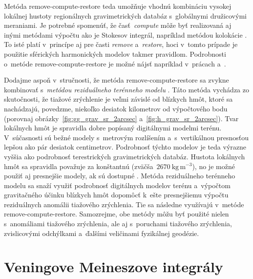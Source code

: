 \documentclass[a4paper, 12pt]{book}
\begin{document}
Metóda remove-compute-restore teda umožňuje vhodnú kombináciu vysokej lokálnej 
hustoty regionálnych gravimetrických databáz s~globálnymi družicovými 
meraniami.  Je potrebné spomenúť, že časť~\emph{compute} môže byť realizovaná 
aj inými metódami výpočtu ako je Stokesov integrál, napríklad metódou kolokácie 
\parencite{MoritzAdvancedGeodesy,MoritzPhysicalGeodesy}.  To isté platí 
v~princípe aj pre časti \emph{remove} a~\emph{restore}, hoci v~tomto prípade je 
použitie sférických harmonických modelov takmer pravidlom.  Podrobnosti 
o~metóde remove-compute-restore je možné nájsť napríklad v~prácach 
\textcite{Sjoberg2005} a~\textcite{MoritzPhysicalGeodesy}.

Dodajme aspoň v~stručnosti, že metóda remove-compute-restore sa zvykne 
kombinovať s~\emph{metódou reziduálneho terénneho modelu} 
\parencite{Forsberg1981,Forsberg1984}.  Táto metóda vychádza zo skutočnosti, že 
tiažové zrýchlenie je veľmi závislé od blízkych hmôt, ktoré sa nachádzajú, 
povedzme, niekoľko desiatok kilometrov od výpočtového bodu (porovnaj 
obrázky~\ref{fig:gg_grav_sr_2arcsec} a~\ref{fig:h_grav_sr_2arcsec}).  Tvar 
lokálnych hmôt je spravidla dobre popísaný digitálnymi modelmi terénu.  
V~súčasnosti sú bežné modely s~metrovým rozlíšením a~s~vertikálnou presnosťou 
lepšou ako pár desiatok centimetrov.  Podrobnosť týchto modelov je teda výrazne 
vyššia ako podrobnosť terestrických gravimetrických databáz.  Hustota lokálnych 
hmôt sa spravidla považuje za konštantnú (zväčša~$2670\ \mathrm{kg}\, 
\mathrm{m}^{-3}$), no je možné použiť aj presnejšie modely, ak sú dostupné 
\parencite[napríklad][]{Yang2018}.  Metóda reziduálneho terénneho modelu sa 
snaží využiť podrobnosť digitálnych modelov terénu a~výpočtom gravitačného 
účinku blízkych hmôt dopomôcť k~ešte presnejšiemu výpočtu reziduálnych anomálii 
tiažového zrýchlenia.  Tie sa následne využívajú v~metóde 
remove-compute-restore.  Samozrejme, obe metódy môžu byť použité nielen 
s~anomáliami tiažového zrýchlenia, ale aj s~poruchami tiažového zrýchlenia, 
zvislicovými odchýlkami a~ďalšími veličinami fyzikálnej geodézie.




\section{Veningove Meineszove integrály}
\label{sec:vm_integral}
\end{document}
